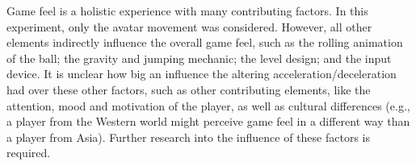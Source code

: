 Game feel is a holistic experience with many contributing factors. In this experiment, only the avatar movement was considered. However, all other elements indirectly influence the overall game feel, such as the rolling animation of the ball; the gravity and jumping mechanic; the level design; and the input device. It is unclear how big an influence the altering acceleration/deceleration had over these other factors, such as other contributing elements, like the attention, mood and motivation of the player, as well as cultural differences (e.g., a player from the Western world might perceive game feel in a different way than a player from Asia). Further research into the influence of these factors is required.
